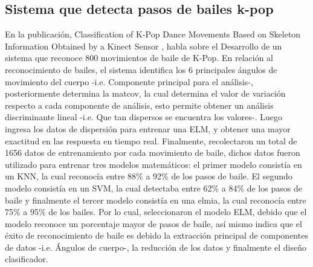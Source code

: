 \subsection{Sistema que detecta pasos de bailes k-pop} \label{tr:9} 
En la publicaci\'on, Classification of K-Pop Dance Movements Based on Skeleton Information Obtained by a Kinect Sensor \cite{kim2017classification}, habla sobre el Desarrollo de un sistema que reconoce 800 movimientos de baile de K-Pop.
\medbreak 
En relaci\'on al reconocimiento de bailes, el sistema identifica los 6 principales \'angulos de movimiento del cuerpo -i.e. Componente principal para el an\'alisis-, posteriormente determina la \gls{matcov}, la cual determina el valor de variaci\'on respecto a cada componente de an\'alisis,  esto permite obtener un an\'alisis discriminante lineal -i.e. Que tan dispersos se encuentra los valores-.
\medbreak 
Luego ingresa los datos de dispersi\'on para entrenar una  \acrfull{ELM}, y obtener una mayor exactitud en las respuesta en tiempo real.
\medbreak 
Finalmente,  recolectaron un total de 1656 datos de entrenamiento por cada movimiento de baile, dichos datos fueron utilizado para entrenar tres modelos matem\'aticos: el primer modelo consist\'ia en un KNN, la cual reconoc\'ia entre 88\% a 92\% de los pasos de baile. El segundo modelo consist\'ia en un SVM, la cual detectaba entre 62\% a 84\% de los pasos de baile y finalmente el tercer modelo consist\'ia en una \gls{elmia}, la cual reconoc\'ia entre 75\% a 95\% de los bailes.
\medbreak 
Por lo cual,   seleccionaron el modelo ELM, debido que el modelo reconoce un porcentaje mayor de pasos de baile, as\'i mismo indica que el \'exito de reconocimiento de baile es debido la extracci\'on principal de componentes de datos -i.e. \'Angulos de cuerpo-, la reducci\'on de los datos y finalmente  el dise\~no clasificador.
